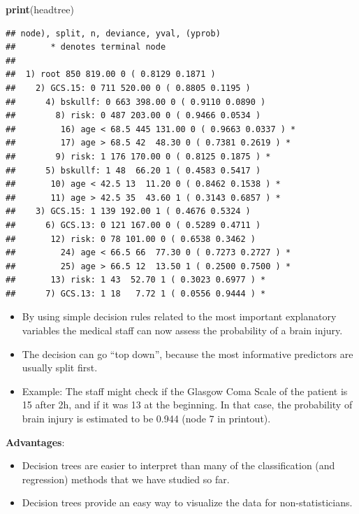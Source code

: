 \documentclass[10pt,ignorenonframetext,]{beamer}
\newenvironment{Shaded}{\begin{snugshade}}{\end{snugshade}}
\newcommand{\KeywordTok}[1]{\textcolor[rgb]{0.13,0.29,0.53}{\textbf{#1}}}
\newcommand{\NormalTok}[1]{#1}
\begin{document}
\begin{frame}[fragile]

\footnotesize

\begin{Shaded}
\begin{Highlighting}[]
\KeywordTok{print}\NormalTok{(headtree)}
\end{Highlighting}
\end{Shaded}

\begin{verbatim}
## node), split, n, deviance, yval, (yprob)
##       * denotes terminal node
## 
##  1) root 850 819.00 0 ( 0.8129 0.1871 )  
##    2) GCS.15: 0 711 520.00 0 ( 0.8805 0.1195 )  
##      4) bskullf: 0 663 398.00 0 ( 0.9110 0.0890 )  
##        8) risk: 0 487 203.00 0 ( 0.9466 0.0534 )  
##         16) age < 68.5 445 131.00 0 ( 0.9663 0.0337 ) *
##         17) age > 68.5 42  48.30 0 ( 0.7381 0.2619 ) *
##        9) risk: 1 176 170.00 0 ( 0.8125 0.1875 ) *
##      5) bskullf: 1 48  66.20 1 ( 0.4583 0.5417 )  
##       10) age < 42.5 13  11.20 0 ( 0.8462 0.1538 ) *
##       11) age > 42.5 35  43.60 1 ( 0.3143 0.6857 ) *
##    3) GCS.15: 1 139 192.00 1 ( 0.4676 0.5324 )  
##      6) GCS.13: 0 121 167.00 0 ( 0.5289 0.4711 )  
##       12) risk: 0 78 101.00 0 ( 0.6538 0.3462 )  
##         24) age < 66.5 66  77.30 0 ( 0.7273 0.2727 ) *
##         25) age > 66.5 12  13.50 1 ( 0.2500 0.7500 ) *
##       13) risk: 1 43  52.70 1 ( 0.3023 0.6977 ) *
##      7) GCS.13: 1 18   7.72 1 ( 0.0556 0.9444 ) *
\end{verbatim}

\normalsize

\end{frame}

\begin{frame}

\begin{itemize}
\item
  By using simple decision rules related to the most important
  explanatory variables the medical staff can now assess the probability
  of a brain injury.
\item
  The decision can go ``top down'', because the most informative
  predictors are usually split first.
\item
  Example: The staff might check if the Glasgow Coma Scale of the
  patient is 15 after 2h, and if it was 13 at the beginning. In that
  case, the probability of brain injury is estimated to be 0.944 (node 7
  in printout).
\end{itemize}

\textbf{Advantages}:

\begin{itemize}
\item
  Decision trees are easier to interpret than many of the classification
  (and regression) methods that we have studied so far.
\item
  Decision trees provide an easy way to visualize the data for
  non-statisticians.
\end{itemize}

\end{frame}
\end{document}
